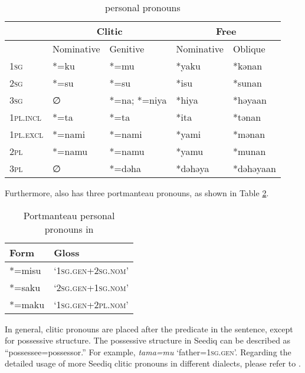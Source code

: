 \begin{table}[!htbp]
\centering
\caption{\psedf personal pronouns}
\label{tab:psedpron}
\begin{tabular}{lllll}
\hline
         & \multicolumn{2}{c}{Clitic} & \multicolumn{2}{c}{Free} \\ \hline
         & Nominative    & Genitive   & Nominative & Oblique     \\ \hline
\textsc{1sg}      & *=ku          & *=mu       & *yaku      & *kənan      \\
\textsc{2sg}      & *=su          & *=su       & *isu       & *sunan      \\
\textsc{3sg}      & ∅             & *=na; *=niya & *hiya      & *həyaan     \\
\textsc{1pl.incl} & *=ta          & *=ta       & *ita       & *tənan      \\
\textsc{1pl.excl} & *=nami        & *=nami     & *yami      & *mənan      \\
\textsc{2pl}      & *=namu        & *=namu     & *yamu      & *munan      \\
\textsc{3pl}      & ∅             & *=dəha     & *dəhəya    & *dəhəyaan   \\ \hline
\end{tabular}
\end{table}

Furthermore, \psedf also has three portmanteau pronouns, as shown in Table \ref{tab:por}.

\begin{table}[!htbp]
\centering
\caption{Portmanteau personal pronouns in \psedf}
\label{tab:por}
\begin{tabular}{ll}
\hline
Form   & Gloss \\ 
\hline
*=misu & `\textsc{1sg.gen+2sg.nom}' \\
*=saku & `\textsc{2sg.gen+1sg.nom}' \\
*=maku & `\textsc{1sg.gen+2pl.nom}' \\
\hline
\end{tabular}
\end{table}

In general, clitic pronouns are placed after the predicate in the sentence, except for possessive structure. The possessive structure in Seediq can be described as ``possessee=possessor.'' For example, \textit{tama=mu} `father=\textsc{1sg.gen}'. Regarding the detailed usage of more Seediq clitic pronouns in different dialects, please refer to \textcite{ochiai2009sedpron,kuondtrvpronoun,holmer2014clitic}.

